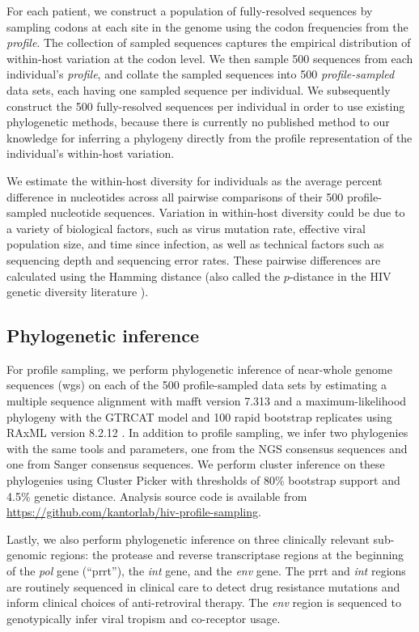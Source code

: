 \documentclass[letterpaper]{article}
\begin{document}
For each patient, we construct a population of fully-resolved sequences by sampling codons at each site in the genome using the codon frequencies from the \emph{profile}. The collection of sampled sequences captures the empirical distribution of within-host variation at the codon level. We then sample 500 sequences from each individual's \emph{profile}, and collate the sampled sequences into 500 \emph{profile-sampled} data sets, each having one sampled sequence per individual. We subsequently construct the 500 fully-resolved sequences per individual in order to use existing phylogenetic methods, because there is currently no published method to our knowledge for inferring a phylogeny directly from the profile representation of the individual's within-host variation.

We estimate the within-host diversity for individuals as the average percent difference in nucleotides across all pairwise comparisons of their 500 profile-sampled nucleotide sequences. Variation in within-host diversity could be due to a variety of biological factors, such as virus mutation rate, effective viral population size, and time since infection, as well as technical factors such as sequencing depth and sequencing error rates. These pairwise differences are calculated using the Hamming distance \parencite{allam} (also called the $p$-distance in the HIV genetic diversity literature \parencite{maldarelli, hassan}).

\subsection*{Phylogenetic inference}

For profile sampling, we perform phylogenetic inference of near-whole genome sequences (wgs) on each of the 500 profile-sampled data sets by estimating a multiple sequence alignment with mafft version 7.313 \parencite{katoh} and a maximum-likelihood phylogeny with the GTRCAT model and 100 rapid bootstrap replicates using RAxML version 8.2.12 \parencite{stamatakis}. In addition to profile sampling, we infer two phylogenies with the same tools and parameters, one from the NGS consensus sequences and one from Sanger consensus sequences. We perform cluster inference on these phylogenies using Cluster Picker \parencite{ragonnet-cronin} with thresholds of 80\% bootstrap support and 4.5\% genetic distance. Analysis source code is available from \url{https://github.com/kantorlab/hiv-profile-sampling}.

Lastly, we also perform phylogenetic inference on three clinically relevant sub-genomic regions: the protease and reverse transcriptase regions at the beginning of the \emph{pol} gene (``prrt''), the \emph{int} gene, and the \emph{env} gene. The prrt and \emph{int} regions are routinely sequenced in clinical care to detect drug resistance mutations and inform clinical choices of anti-retroviral therapy. The \emph{env} region is sequenced to genotypically infer viral tropism and co-receptor usage.
\end{document}
